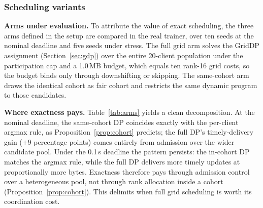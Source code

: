 \documentclass[a4paper,fleqn]{cas-dc}
\begin{document}
\begin{table}[pos=tbp]
\centering\footnotesize
\caption{External baselines in the real trainer, ten seeds; FP16 rows: five seeds. The FP16 rows use the FP16 serialized sizes of Table~\ref{tab:audit}.}
\label{tab:extbaselines}
\end{table}


\subsubsection{Scheduling variants}
\label{sec:dpvfair}
\textbf{Arms under evaluation.} To attribute the value of exact scheduling, the three arms defined in the setup are compared in the real trainer, over ten seeds at the nominal deadline and five seeds under stress. The full grid arm solves the GridDP assignment (Section~\ref{sec:gdp}) over the entire 20-client population under the participation cap and a 1.0\,MB budget, which equals ten rank-16 grid costs, so the budget binds only through downshifting or skipping. The same-cohort arm draws the identical cohort as fair cohort and restricts the same dynamic program to those candidates.

\textbf{Where exactness pays.} Table~\ref{tab:arms} yields a clean decomposition. At the nominal deadline, the same-cohort DP coincides exactly with the per-client argmax rule, as Proposition~\ref{prop:cohort} predicts; the full DP's timely-delivery gain ($+9$ percentage points) comes entirely from admission over the wider candidate pool. Under the 0.1\,s deadline the pattern persists: the in-cohort DP matches the argmax rule, while the full DP delivers more timely updates at proportionally more bytes. Exactness therefore pays through admission control over a heterogeneous pool, not through rank allocation inside a cohort (Proposition~\ref{prop:cohort}). This delimits when full grid scheduling is worth its coordination cost.
\end{document}
